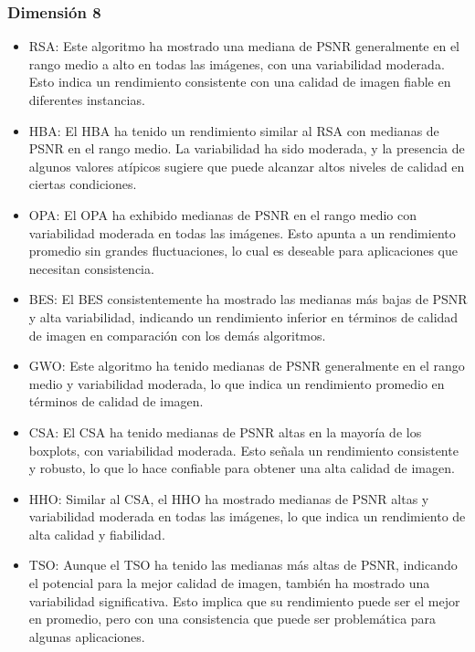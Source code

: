 \documentclass[conference]{IEEEtran}
\begin{document}
\subsubsection{Dimensión 8}
\begin{itemize}
\item RSA: Este algoritmo ha mostrado una mediana de PSNR generalmente en el rango medio a alto en todas las imágenes, con una variabilidad moderada. Esto indica un rendimiento consistente con una calidad de imagen fiable en diferentes instancias.

\item HBA: El HBA ha tenido un rendimiento similar al RSA con medianas de PSNR en el rango medio. La variabilidad ha sido moderada, y la presencia de algunos valores atípicos sugiere que puede alcanzar altos niveles de calidad en ciertas condiciones.

\item OPA: El OPA ha exhibido medianas de PSNR en el rango medio con variabilidad moderada en todas las imágenes. Esto apunta a un rendimiento promedio sin grandes fluctuaciones, lo cual es deseable para aplicaciones que necesitan consistencia.

\item BES: El BES consistentemente ha mostrado las medianas más bajas de PSNR y alta variabilidad, indicando un rendimiento inferior en términos de calidad de imagen en comparación con los demás algoritmos.

\item GWO: Este algoritmo ha tenido medianas de PSNR generalmente en el rango medio y variabilidad moderada, lo que indica un rendimiento promedio en términos de calidad de imagen.

\item CSA: El CSA ha tenido medianas de PSNR altas en la mayoría de los boxplots, con variabilidad moderada. Esto señala un rendimiento consistente y robusto, lo que lo hace confiable para obtener una alta calidad de imagen.

\item HHO: Similar al CSA, el HHO ha mostrado medianas de PSNR altas y variabilidad moderada en todas las imágenes, lo que indica un rendimiento de alta calidad y fiabilidad.

\item TSO: Aunque el TSO ha tenido las medianas más altas de PSNR, indicando el potencial para la mejor calidad de imagen, también ha mostrado una variabilidad significativa. Esto implica que su rendimiento puede ser el mejor en promedio, pero con una consistencia que puede ser problemática para algunas aplicaciones.
\end{itemize}
\end{document}
